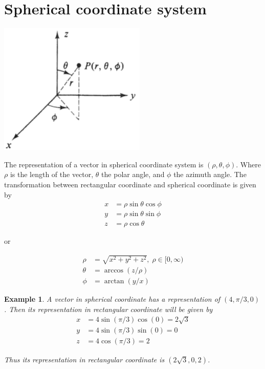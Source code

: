 \documentclass{article}
\newtheorem{ex}{Example}
\begin{document}
\section{Spherical coordinate system}
\begin{center}
	\includegraphics*[width=7cm]{spherical-coordinates.png}
\end{center}
The representation of a vector in spherical coordinate system is $(\rho,\theta,\phi)$. Where $\rho$ is the length of the vector, $\theta$ the polar angle, and $\phi$ the azimuth angle. The transformation between rectangular coordinate and spherical coordinate is given by
\begin{align*}
x &= \rho\sin\theta\cos\phi\\
y &= \rho\sin\theta\sin\phi\\
z &= \rho\cos\theta
\end{align*}

or 

\begin{align*}
\rho &= \sqrt{x^2+y^2+z^2},\;\rho\in[0,\infty)\\
\theta &= \arccos(z/\rho)\\
\phi &= \arctan(y/x) 
\end{align*}


\begin{ex}
	A vector in spherical coordinate has a representation of $(4,\pi/3,0)$. Then its representation in rectangular coordinate will be given by
	\begin{align*}
	x &= 4\sin(\pi/3)\cos(0) = 2\sqrt{3}\\
	y &= 4\sin(\pi/3)\sin(0) = 0\\
	z &= 4\cos(\pi/3) = 2
	\end{align*}
	
	Thus its representation in rectangular coordinate is $(2\sqrt{3},0,2)$.
\end{ex}
\end{document}
